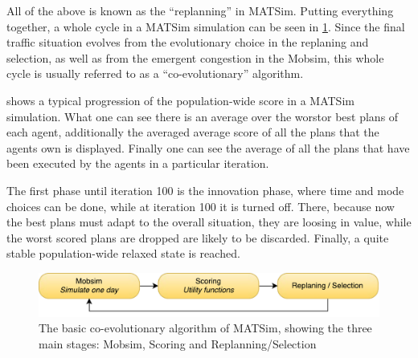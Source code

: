 All of the above is known as the ``replanning'' in MATSim. Putting everything
together, a whole cycle in a MATSim simulation can be seen in \cref{fig:matsimcycle}. Since the
final traffic situation evolves from the evolutionary choice in the replaning and
selection, as well as from the emergent congestion in the Mobsim, this whole
cycle is usually referred to as a ``co-evolutionary'' algorithm.

 shows a typical progression of the population-wide score in
a MATSim simulation. What one can see there is an average over the worstor best plans
of each agent, additionally the averaged average score of all the plans that the agents
own is displayed. Finally one can see the average of all the plans that have been executed
by the agents in a particular iteration.

The first phase until iteration 100 is the innovation phase, where time and mode
choices can be done, while at iteration 100 it is turned off. There, because now
the best plans must adapt to the overall situation, they are loosing in value,
while the worst scored plans are dropped are likely to be discarded. Finally,
a quite stable population-wide relaxed state is reached.

\begin{figure}
    \centering
    \includegraphics[width=1.0\textwidth]{figures/matsimcycle.pdf}
    \caption{The basic co-evolutionary algorithm of MATSim, showing the three main
    stages: Mobsim, Scoring and Replanning/Selection}
    \label{fig:matsimcycle}
\end{figure}

